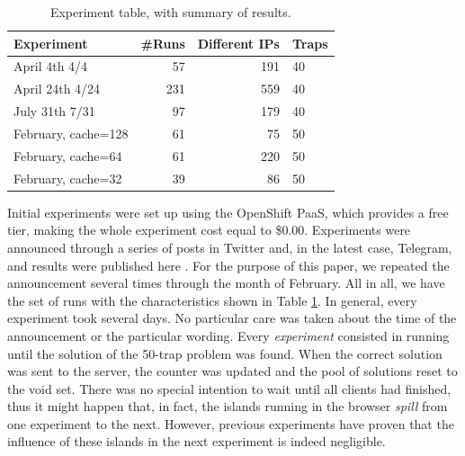 \documentclass[letterpaper]{article}
\begin{document}
\begin{table}[htb]
\caption{Experiment table, with summary of results. \label{tab:runs}}
\begin{center}
\begin{tabular}{l|rrl}
\hline
Experiment & \#Runs & Different IPs & Traps \\
\hline
April 4th 4/4 & 57 & 191 & 40 \\
April 24th 4/24 &  231 & 559& 40  \\
July 31th 7/31 & 97 & 179 & 40 \\
\hline
February, cache=128 & 61 & 75 & 50  \\
February, cache=64 & 61 & 220 & 50  \\
February, cache=32 & 39 & 86 & 50  \\
\hline
\end{tabular}
\end{center}
\end{table}
%
Initial experiments were set up using the OpenShift
PaaS, which provides a free tier, making the whole experiment cost
equal to \$0.00. Experiments were
announced through a series of posts in Twitter and, in the latest case, Telegram, and
results were published here \citep{DBLP:conf/gecco/GuervosG15}. For the
purpose of this paper, we repeated the announcement several times
through the month of February. All  %
in all, we have the set of runs with the characteristics shown in
Table \ref{tab:runs}. In general, every experiment took several
days. No particular care was taken about the time of the announcement
or the particular wording. Every {\em experiment} consisted in running
until the solution of the 50-trap problem was found. When the correct
solution was sent to the server, the counter was updated and the pool
of solutions reset to the void set. There was no special intention to wait
until all clients had finished, thus it might happen that, in fact,
the islands running in the browser {\em spill} from one experiment to
the next. However, previous experiments have proven that the influence
of these islands in the next experiment is indeed negligible.
\end{document}
